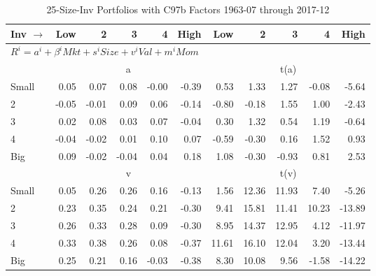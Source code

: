 
\begin{table}[!ht]
\footnotesize
\centering
\caption{25-Size-Inv Portfolios with C97b Factors 1963-07 through 2017-12}
\begin{tabular}{lrrrrrrrrrr}
  \toprule
    Inv $\rightarrow$ & Low & 2 & 3 & 4 & High & Low & 2 & 3 & 4 & High \\ 
  \midrule
  \multicolumn{11}{l}{$R^i=a^i+\beta^iMkt+s^iSize+v^iVal+m^iMom$} \\

  
    
      & \multicolumn{5}{c}{a} & \multicolumn{5}{c}{t(a)}
    
    \\
      \cmidrule(r){2-6} \cmidrule(r){7-11}

    Small   & 0.05  & 0.07  & 0.08  & -0.00  & -0.39  & 0.53  & 1.33  & 1.27  & -0.08  & -5.64  \\
         2  & -0.05  & -0.01  & 0.09  & 0.06  & -0.14  & -0.80  & -0.18  & 1.55  & 1.00  & -2.43  \\
         3  & 0.02  & 0.08  & 0.03  & 0.07  & -0.04  & 0.30  & 1.32  & 0.54  & 1.19  & -0.64  \\
         4  & -0.04  & -0.02  & 0.01  & 0.10  & 0.07  & -0.59  & -0.30  & 0.16  & 1.52  & 0.93  \\
    Big     & 0.09  & -0.02  & -0.04  & 0.04  & 0.18  & 1.08  & -0.30  & -0.93  & 0.81  & 2.53  \\

  
    
      & \multicolumn{5}{c}{v} & \multicolumn{5}{c}{t(v)}
    
    \\
      \cmidrule(r){2-6} \cmidrule(r){7-11}

    Small   & 0.05  & 0.26  & 0.26  & 0.16  & -0.13  & 1.56  & 12.36  & 11.93  & 7.40  & -5.26  \\
         2  & 0.23  & 0.35  & 0.24  & 0.21  & -0.30  & 9.41  & 15.81  & 11.41  & 10.23  & -13.89  \\
         3  & 0.26  & 0.33  & 0.28  & 0.09  & -0.30  & 8.95  & 14.37  & 12.95  & 4.12  & -11.97  \\
         4  & 0.33  & 0.38  & 0.26  & 0.08  & -0.37  & 11.61  & 16.10  & 12.04  & 3.20  & -13.44  \\
    Big     & 0.25  & 0.21  & 0.16  & -0.03  & -0.38  & 8.30  & 10.08  & 9.56  & -1.58  & -14.22  \\

  
    

\end{tabular}
\end{table}
